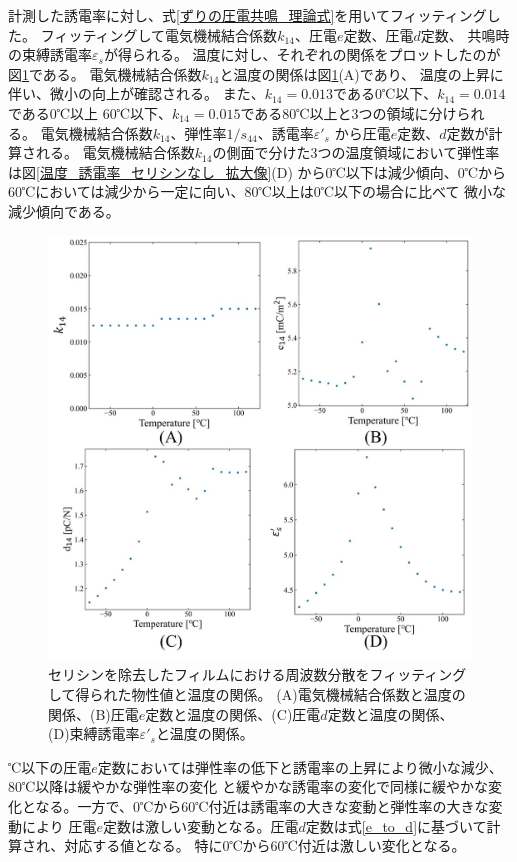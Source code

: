 \documentclass[dvipdfmx,12pt,a4paper]{jreport}
\begin{document}
		計測した誘電率に対し、式\eqref{ずりの圧電共鳴_理論式}を用いてフィッティングした。
		フィッティングして電気機械結合係数$k_{14}$、圧電$e$定数、圧電$d$定数、
		共鳴時の束縛誘電率$\varepsilon_s$が得られる。
		温度に対し、それぞれの関係をプロットしたのが図\ref{温度_k_e_d_セリシンなし}である。
		電気機械結合係数$k_{14}$と温度の関係は図\ref{温度_k_e_d_セリシンなし}(A)であり、
		温度の上昇に伴い、微小の向上が確認される。
		また、$k_{14} = 0.013$である0℃以下、$k_{14} = 0.014$である0℃以上
		60℃以下、$k_{14} = 0.015$である80℃以上と3つの領域に分けられる。
		電気機械結合係数$k_{14}$、弾性率$1/s_{44}$、誘電率$\varepsilon'_s$
		から圧電$e$定数、$d$定数が計算される。
		電気機械結合係数$k_{14}$の側面で分けた3つの温度領域において弾性率は図\ref{温度_誘電率_セリシンなし_拡大像}(D)
		から0℃以下は減少傾向、0℃から60℃においては減少から一定に向い、80℃以上は0℃以下の場合に比べて
		微小な減少傾向である。
			\begin{figure}[H]
				\centering
				\includegraphics[scale=0.8]{温度_k_e_d_セリシンなし.jpg}
				\caption{セリシンを除去したフィルムにおける周波数分散をフィッティングして得られた物性値と温度の関係。
				(A)電気機械結合係数と温度の関係、(B)圧電$e$定数と温度の関係、(C)圧電$d$定数と温度の関係、
				(D)束縛誘電率$\varepsilon'_s$と温度の関係。}
				\label{温度_k_e_d_セリシンなし}
			\end{figure}
			℃以下の圧電$e$定数においては弾性率の低下と誘電率の上昇により微小な減少、80℃以降は緩やかな弾性率の変化
			と緩やかな誘電率の変化で同様に緩やかな変化となる。一方で、0℃から60℃付近は誘電率の大きな変動と弾性率の大きな変動により
			圧電$e$定数は激しい変動となる。圧電$d$定数は式\eqref{e_to_d}に基づいて計算され、対応する値となる。
			特に0℃から60℃付近は激しい変化となる。
\end{document}
